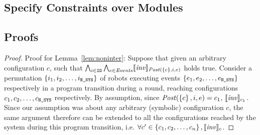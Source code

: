 \subsection{Specify Constraints over Modules}
\label{sec:module}


\subsection{Proofs}
\begin{proof}
    Proof for Lemma~\ref{lem:noninter}:
    Suppose that given an arbitrary configuration $c$, such that $\bigwedge_{i\in \texttt{ID}}\bigwedge_{e \in \mathit{Events}} \llbracket\mathit{inv}\rrbracket_{\mathit{Post}(\left\{c\right\}, i, e)}$ holds true. Consider a permutation $\left\{i_1,i_2,\ldots,i_{\texttt{N\_SYS}}\right\}$ of robots executing events $\left\{e_1, e_2, \ldots , e_{\texttt{N\_SYS}}\right\}$ respectively in a program transition during a round, reaching configurations $c_1, c_2, \ldots, c_{\texttt{N\_SYS}}$ respectively. By assumption, since $\mathit{Post}(\left\{c\right\},i,e) = c_1$, $\llbracket\mathit{inv}\rrbracket_{c_1}$. Since our assumption was about any arbitrary (symbolic) configuration $c$, the same argument therefore can be extended to all the configurations reached by the system during this program transition, i.e. $\forall c' \in \left\{c_1, c_2, \ldots, c_n\right\}, \llbracket\mathit{inv}\rrbracket_{c}$.
\end{proof}